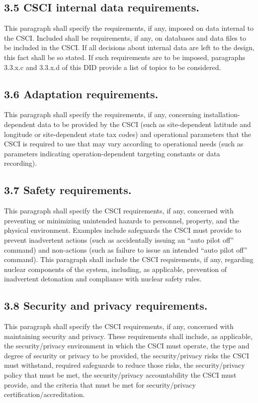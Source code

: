 \subsection{3.5 CSCI internal data requirements.}

This paragraph shall specify the requirements, if any, imposed on data
internal to the CSCI. Included shall be requirements, if any, on
databases and data files to be included in the CSCI. If all decisions
about internal data are left to the design, this fact shall be so
stated. If such requirements are to be imposed, paragraphs 3.3.x.c and
3.3.x.d of this DID provide a list of topics to be considered.

\subsection{3.6 Adaptation requirements.}

This paragraph shall specify the requirements, if any, concerning
installation-dependent data to be provided by the CSCI (such as
site-dependent latitude and longitude or site-dependent state tax codes)
and operational parameters that the CSCI is required to use that may
vary according to operational needs (such as parameters indicating
operation-dependent targeting constants or data recording).

\subsection{3.7 Safety requirements.}

This paragraph shall specify the CSCI requirements, if any, concerned
with preventing or minimizing unintended hazards to personnel, property,
and the physical environment. Examples include safeguards the CSCI must
provide to prevent inadvertent actions (such as accidentally issuing an
``auto pilot off'' command) and non-actions (such as failure to issue an
intended ``auto pilot off'' command). This paragraph shall include the
CSCI requirements, if any, regarding nuclear components of the system,
including, as applicable, prevention of inadvertent detonation and
compliance with nuclear safety rules.

\subsection{3.8 Security and privacy requirements.}

This paragraph shall specify the CSCI requirements, if any, concerned
with maintaining security and privacy. These requirements shall include,
as applicable, the security/privacy environment in which the CSCI must
operate, the type and degree of security or privacy to be provided, the
security/privacy risks the CSCI must withstand, required safeguards to
reduce those risks, the security/privacy policy that must be met, the
security/privacy accountability the CSCI must provide, and the criteria
that must be met for security/privacy certification/accreditation.

